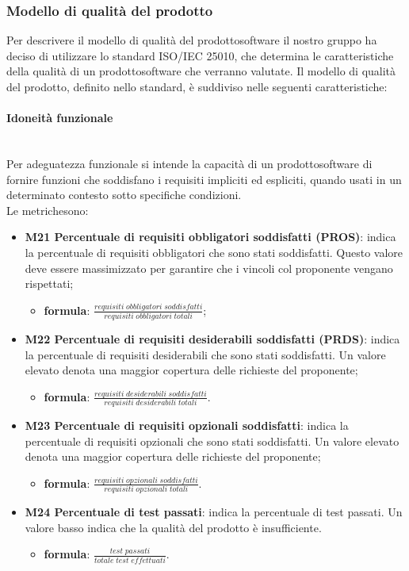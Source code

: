\subsubsection{Modello di qualità del prodotto} 
Per descrivere il modello di qualità del prodotto\glosp software il nostro gruppo ha deciso di utilizzare lo standard ISO/IEC 25010, che determina le caratteristiche della qualità di un prodotto\glosp software che verranno valutate. Il modello di qualità del prodotto\glo, definito nello standard, è suddiviso nelle seguenti caratteristiche:
	\paragraph{Idoneità funzionale} \mbox{}\\[1mm]
	Per adeguatezza funzionale si intende la capacità di un prodotto\glosp software di fornire funzioni che soddisfano i requisiti impliciti ed espliciti, quando usati in un determinato contesto sotto specifiche condizioni. \\
	Le metriche\glosp sono:
	\begin{itemize}
		\item \textbf{M21 Percentuale di requisiti obbligatori soddisfatti (PROS)}: indica la percentuale di requisiti obbligatori che sono stati soddisfatti. Questo valore deve essere massimizzato per garantire che i vincoli col proponente vengano rispettati;
		\begin{itemize}
			\item[] \textbf{formula}: $\frac{requisiti \; obbligatori \; soddisfatti}{requisiti \; obbligatori \; totali}$;
		\end{itemize} 
		\item \textbf{M22 Percentuale di requisiti desiderabili soddisfatti (PRDS)}:
		indica la percentuale di requisiti desiderabili che sono stati soddisfatti. Un valore elevato denota una maggior copertura delle richieste del proponente;
		\begin{itemize}
			\item[] \textbf{formula}: $\frac{requisiti \; desiderabili \; soddisfatti}{requisiti \; desiderabili \; totali}$.
		\end{itemize} 
		\item \textbf{M23 Percentuale di requisiti opzionali soddisfatti}:
		indica la percentuale di requisiti opzionali che sono stati soddisfatti. Un valore elevato denota una maggior copertura delle richieste del proponente;
		\begin{itemize}
			\item[] \textbf{formula}: $\frac{requisiti \; opzionali \; soddisfatti}{requisiti \; opzionali \; totali}$.
		\end{itemize} 
		\item \textbf{M24 Percentuale di test passati}:
		indica la percentuale di test passati. Un valore basso indica che la qualità del prodotto è insufficiente. 
		\begin{itemize}
			\item[] \textbf{formula}: $\frac{test \; passati}{totale \; test \; effettuati}$.
		\end{itemize}
	\end{itemize}

